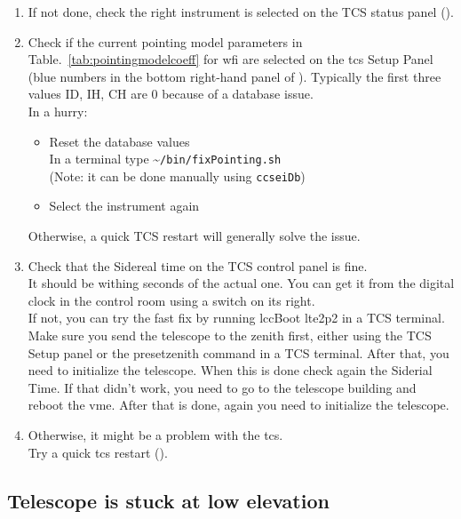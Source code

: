 \documentclass[11pt,fleqn,a4paper]{book}
\begin{document}
\begin{enumerate}   
    \item If not done, check the right instrument is selected on the \gls{TCS status panel}
        ().
    \item Check if the current \gls{pointing model} parameters in Table.~\ref{tab:pointingmodelcoeff} for \gls{wfi} are selected on the \gls{tcs} Setup Panel (blue numbers in the bottom right-hand panel of ). Typically
        the first three values ID, IH, CH are 0 because of a database issue.\\
        In a hurry:
        \begin{itemize}
            \item Reset the database values\\
                  In a terminal type \~{}\texttt{/bin/fixPointing.sh}\\
                  (Note: it can be done manually using \texttt{ccseiDb})
            \item Select the instrument again
        \end{itemize}
        Otherwise, a quick TCS restart will generally solve the issue.
    \item Check that the Sidereal time on the \gls{TCS control panel} is fine.\\
      It should be withing seconds of the actual one.  You can get it from
      the digital clock in the \gls{control room} using a switch on its right.\\
      If not, you can try the fast fix by running lccBoot lte2p2 in a TCS terminal. Make sure you send the telescope to the zenith first, either using the TCS Setup panel or the presetzenith command in a TCS terminal. After that, you need to initialize the telescope. When this is done check again the Siderial Time. If that didn't work, you need to go to the telescope building and reboot the \gls{vme}. After that is done, again you need to initialize the telescope.
    \item Otherwise, it might be a problem with the \gls{tcs}.\\ 
       Try a quick \gls{tcs} restart ().
\end{enumerate}  

\subsection{Telescope is stuck at low elevation}
\end{document}
